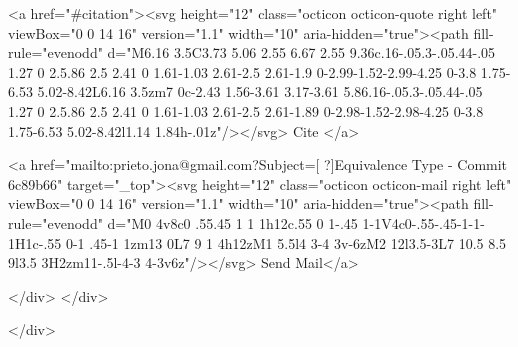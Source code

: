       <a  href="#citation"><svg height="12" class="octicon octicon-quote right left" viewBox="0 0 14 16" version="1.1" width="10" aria-hidden="true"><path fill-rule="evenodd" d="M6.16 3.5C3.73 5.06 2.55 6.67 2.55 9.36c.16-.05.3-.05.44-.05 1.27 0 2.5.86 2.5 2.41 0 1.61-1.03 2.61-2.5 2.61-1.9 0-2.99-1.52-2.99-4.25 0-3.8 1.75-6.53 5.02-8.42L6.16 3.5zm7 0c-2.43 1.56-3.61 3.17-3.61 5.86.16-.05.3-.05.44-.05 1.27 0 2.5.86 2.5 2.41 0 1.61-1.03 2.61-2.5 2.61-1.89 0-2.98-1.52-2.98-4.25 0-3.8 1.75-6.53 5.02-8.42l1.14 1.84h-.01z"/></svg> Cite
      </a>

      <a href="mailto:prieto.jona@gmail.com?Subject=[ ?]Equivalence Type - Commit 6c89b66" target="_top"><svg height="12" class="octicon octicon-mail right left" viewBox="0 0 14 16" version="1.1" width="10" aria-hidden="true"><path fill-rule="evenodd" d="M0 4v8c0 .55.45 1 1 1h12c.55 0 1-.45 1-1V4c0-.55-.45-1-1-1H1c-.55 0-1 .45-1 1zm13 0L7 9 1 4h12zM1 5.5l4 3-4 3v-6zM2 12l3.5-3L7 10.5 8.5 9l3.5 3H2zm11-.5l-4-3 4-3v6z"/></svg> Send Mail</a>

    </div>
  </div>

</div>




